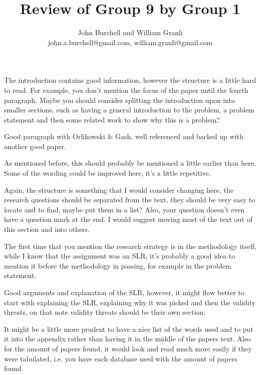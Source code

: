 \documentclass[times, 10pt,twocolumn]{article}
\begin{document}
\title{Review of Group 9 by Group 1}

\author{John Burchell and William Granli \\
john.a.burchell@gmail.com, william.granli@gmail.com}



\maketitle
\thispagestyle{empty}

The introduction contains good information, however the structure is a little hard to read. For example, you don't mention the focus of the paper until the fourth paragraph. Maybe you should consider splitting the introduction upon into smaller sections, such as having a general introduction to the problem, a problem statement and then some related work to show why this is a problem?

Good paragraph with Orlikowski \& Gash, well referenced and backed up with another good paper.

As mentioned before, this should probably be mentioned a little earlier than here. Some of the wording could be improved here, it's a little repetitive. 

Again, the structure is something that I would consider changing here, the research questions should be separated from the text, they should be very easy to locate and to find, maybe put them in a list? Also, your question doesn't even have a question mark at the end. I would suggest moving most of the text out of this section and into others.

The first time that you mention the research strategy is in the methodology itself, while I know that the assignment was an SLR, it's probably a good idea to mention it before the methodology in passing, for example in the problem statement.

Good arguments and explanation of the SLR, however, it might flow better to start with explaining the SLR, explaining why it was picked and then the validity threats, on that note validity threats should be their own section.

It might be a little more prudent to have a nice list of the words used and to put it into the appendix rather than having it in the middle of the papers text. Also for the amount of papers found, it would look and read much more easily if they were tabulated, i.e. you have each database used with the amount of papers found.
\end{document}
